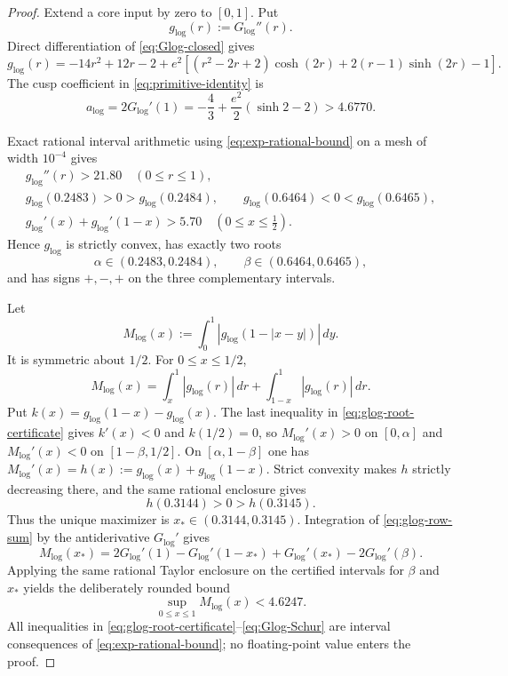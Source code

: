 \begin{proof}
Extend a core input by zero to $[0,1]$.  Put
\[
g_{\log}(r):=G_{\log}''(r).
\]
Direct differentiation of \eqref{eq:Glog-closed} gives
\begin{equation}
\boxed{
g_{\log}(r)=-14r^2+12r-2
+e^2\left[(r^2-2r+2)\cosh(2r)
 +2(r-1)\sinh(2r)-1\right].
}
\label{eq:glog-second}
\end{equation}
The cusp coefficient in \eqref{eq:primitive-identity} is
\begin{equation}
\boxed{
a_{\log}=2G_{\log}'(1)
=-\frac43+\frac{e^2}{2}(\sinh2-2)>4.6770.}
\label{eq:logonly-cusp}
\end{equation}

Exact rational interval arithmetic using \eqref{eq:exp-rational-bound} on a
mesh of width $10^{-4}$ gives
\begin{equation}
\begin{gathered}
 g_{\log}''(r)>21.80\quad(0\le r\le1),\\
 g_{\log}(0.2483)>0>g_{\log}(0.2484),\qquad
 g_{\log}(0.6464)<0<g_{\log}(0.6465),\\
 g_{\log}'(x)+g_{\log}'(1-x)>5.70\quad(0\le x\le\tfrac12).
\end{gathered}
\label{eq:glog-root-certificate}
\end{equation}
Hence $g_{\log}$ is strictly convex, has exactly two roots
\[
\alpha\in(0.2483,0.2484),\qquad
\beta\in(0.6464,0.6465),
\]
and has signs $+,-,+$ on the three complementary intervals.

Let
\[
M_{\log}(x):=\int_0^1|g_{\log}(1-|x-y|)|\,dy.
\]
It is symmetric about $1/2$.  For $0\le x\le1/2$,
\begin{equation}
M_{\log}(x)
=\int_x^1|g_{\log}(r)|\,dr
 +\int_{1-x}^1|g_{\log}(r)|\,dr.
\label{eq:glog-row-sum}
\end{equation}
Put $k(x)=g_{\log}(1-x)-g_{\log}(x)$.  The last inequality in
\eqref{eq:glog-root-certificate} gives $k'(x)<0$ and $k(1/2)=0$, so
$M_{\log}'(x)>0$ on $[0,\alpha]$ and $M_{\log}'(x)<0$ on
$[1-\beta,1/2]$.  On $[\alpha,1-\beta]$ one has
$M_{\log}'(x)=h(x):=g_{\log}(x)+g_{\log}(1-x)$.  Strict convexity makes $h$
strictly decreasing there, and the same rational enclosure gives
\[
h(0.3144)>0>h(0.3145).
\]
Thus the unique maximizer is $x_*\in(0.3144,0.3145)$.  Integration of
\eqref{eq:glog-row-sum} by the antiderivative $G_{\log}'$ gives
\[
M_{\log}(x_*)
=2G_{\log}'(1)-G_{\log}'(1-x_*)
 +G_{\log}'(x_*)-2G_{\log}'(\beta).
\]
Applying the same rational Taylor enclosure on the certified intervals for
$\beta$ and $x_*$ yields the deliberately rounded bound
\begin{equation}
\boxed{\sup_{0\le x\le1}M_{\log}(x)<4.6247.}
\label{eq:Glog-Schur}
\end{equation}
All inequalities in
\eqref{eq:glog-root-certificate}--\eqref{eq:Glog-Schur} are interval
consequences of \eqref{eq:exp-rational-bound}; no floating-point value enters
the proof.


\end{proof}

